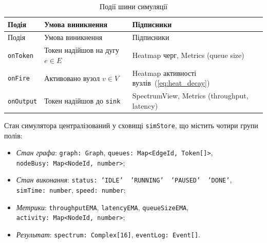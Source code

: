 \documentclass[
]{article}
\begin{document}
\begin{longtable}[]{@{}
  >{\raggedright\arraybackslash}p{}
  >{\raggedright\arraybackslash}p{}
  >{\raggedright\arraybackslash}p{}@{}}
\caption{Події шини симуляції}\tabularnewline
\toprule\noalign{}
\begin{minipage}[b]{\linewidth}\raggedright
Подія
\end{minipage} & \begin{minipage}[b]{\linewidth}\raggedright
Умова виникнення
\end{minipage} & \begin{minipage}[b]{\linewidth}\raggedright
Підписники
\end{minipage} \\
\midrule\noalign{}
\endfirsthead
\toprule\noalign{}
\begin{minipage}[b]{\linewidth}\raggedright
Подія
\end{minipage} & \begin{minipage}[b]{\linewidth}\raggedright
Умова виникнення
\end{minipage} & \begin{minipage}[b]{\linewidth}\raggedright
Підписники
\end{minipage} \\
\midrule\noalign{}
\endhead
\bottomrule\noalign{}
\endlastfoot
\texttt{onToken} & Токен надійшов на дугу \(e \in E\) & Heatmap черг,
Metrics (queue size) \\
\texttt{onFire} & Активовано вузол \(v \in V\) & Heatmap активності
вузлів~(\hyperref[eq:heat_decay]{{[}eq:heat\_decay{]}}) \\
\texttt{onOutput} & Токен надійшов до \texttt{sink} & SpectrumView,
Metrics (throughput, latency) \\
\end{longtable}

Стан симулятора централізований у сховищі \texttt{simStore}, що містить
чотири групи полів:

\begin{itemize}
\item
  \emph{Стан графа}: \texttt{graph}\texttt{:\ }\texttt{Graph},
  \texttt{queues}\texttt{:\ }\texttt{Map}\texttt{\textless{}}\texttt{EdgeId}\texttt{,\ }\texttt{Token}\texttt{{[}{]}\textgreater{}},
  \texttt{nodeBusy}\texttt{:\ }\texttt{Map}\texttt{\textless{}}\texttt{NodeId}\texttt{,\ }\texttt{number}\texttt{\textgreater{}};
\item
  \emph{Стан виконання}:
  \texttt{status}\texttt{:\ ’IDLE’\ \textbar{}\ ’RUNNING’\ \textbar{}\ ’PAUSED’\ \textbar{}\ ’DONE’},
  \texttt{simTime}\texttt{:\ }\texttt{number},
  \texttt{speed}\texttt{:\ }\texttt{number};
\item
  \emph{Метрики}: \texttt{throughputEMA}, \texttt{latencyEMA},
  \texttt{queueSizeEMA},
  \texttt{activity}\texttt{:\ }\texttt{Map}\texttt{\textless{}}\texttt{NodeId}\texttt{,\ }\texttt{number}\texttt{\textgreater{}};
\item
  \emph{Результат}:
  \texttt{spectrum}\texttt{:\ }\texttt{Complex}\texttt{{[}16{]}},
  \texttt{eventLog}\texttt{:\ }\texttt{Event}\texttt{{[}{]}}.
\end{itemize}
\end{document}
